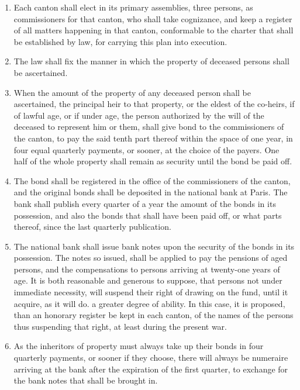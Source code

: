 \begin{enumerate}

	\item Each canton shall elect in its primary assemblies, three persons, as commissioners for that canton, who shall take cognizance, and keep a register of all matters happening in that canton, conformable to the charter that shall be established by law, for carrying this plan into execution.

	\item The law shall fix the manner in which the property of deceased persons shall be ascertained.

	\item When the amount of the property of any deceased person shall be ascertained, the principal heir to that property, or the eldest of the co-heirs, if of lawful age, or if under age, the person authorized by the will of the deceased to represent him or them, shall give bond to the commissioners of the canton, to pay the said tenth part thereof within the space of one year, in four equal quarterly payments, or sooner, at the choice of the payers. One half of the whole property shall remain as security until the bond be paid off.

	\item The bond shall be registered in the office of the commissioners of the canton, and the original bonds shall be deposited in the national bank at Paris. The bank shall publish every quarter of a year the amount of the bonds in its possession, and also the bonds that shall have been paid off, or what parts thereof, since the last quarterly publication.

	\item The national bank shall issue bank notes upon the security of the bonds in its possession. The notes so issued, shall be applied to pay the pensions of aged persons, and the compensations to persons arriving at twenty-one years of age. It is both reasonable and generous to suppose, that persons not under immediate necessity, will suspend their right of drawing on the fund, until it acquire, as it will do. a greater degree of ability. In this case, it is proposed, than an honorary register be kept in each canton, of the names of the persons thus suspending that right, at least during the present war.

	\item As the inheritors of property must always take up their bonds in four quarterly payments, or sooner if they choose, there will always be numeraire arriving at the bank after the expiration of the first quarter, to exchange for the bank notes that shall be brought in.


\end{enumerate}

